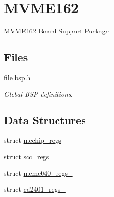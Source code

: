 \hypertarget{group__RTEMSBSPsM68kMVME162}{}\section{M\+V\+M\+E162}
\label{group__RTEMSBSPsM68kMVME162}


M\+V\+M\+E162 Board Support Package.  


\subsection*{Files}
\begin{DoxyCompactItemize}
\item 
file \mbox{\hyperlink{bsps_2m68k_2mvme162_2include_2bsp_8h}{bsp.\+h}}
\begin{DoxyCompactList}\small\item\em Global B\+SP definitions. \end{DoxyCompactList}\end{DoxyCompactItemize}
\subsection*{Data Structures}
\begin{DoxyCompactItemize}
\item 
struct \mbox{\hyperlink{structmcchip__regs}{mcchip\+\_\+regs}}
\item 
struct \mbox{\hyperlink{structscc__regs}{scc\+\_\+regs}}
\item 
struct \mbox{\hyperlink{structmemc040__regs__}{memc040\+\_\+regs\+\_\+}}
\item 
struct \mbox{\hyperlink{structcd2401__regs__}{cd2401\+\_\+regs\+\_\+}}
\end{DoxyCompactItemize}
